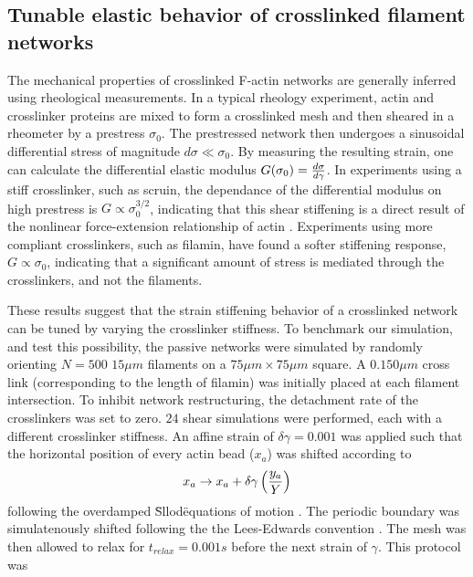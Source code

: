 \documentclass[12pt]{article}
\begin{document}
\subsection{Tunable elastic behavior of crosslinked filament networks}
\par
The mechanical properties of crosslinked F-actin networks are generally
inferred using rheological measurements\cite{gardel2004,koenderink2006,kasza2009,lin2010}.
In a typical rheology experiment, actin and crosslinker proteins are mixed to
form a crosslinked mesh and then sheared in a rheometer by a prestress
$\sigma_0$. The prestressed network then undergoes a sinusoidal
differential stress of magnitude $d\sigma\ll\sigma_0$. By measuring the resulting
strain, one can calculate the differential elastic modulus
$G(\sigma_0) = {d\sigma\over d\gamma}$. In experiments using a stiff
crosslinker, such as scruin, the dependance of the differential modulus on high
prestress is $G\propto\sigma_0^{3/2}$, indicating that this shear stiffening is
a direct result of the nonlinear force-extension relationship of actin 
\cite{gardel2004,lin2010}. Experiments using more compliant crosslinkers,
such as filamin, have found a softer stiffening response, $G\propto\sigma_0$,
indicating that a significant amount of stress is mediated through the
crosslinkers, and not the filaments\cite{kasza2009}.
\par 
These results suggest that the strain stiffening behavior of a crosslinked 
network can be tuned by varying the crosslinker
stiffness. To benchmark our simulation, and test this possibility, the 
passive networks were simulated by randomly orienting $N = 500$ $15\mu m$ 
filaments on a $75\mu m \times 75\mu m$ square. A $0.150\mu m$ cross link
(corresponding to the length of filamin) was initially placed at each filament
intersection.  
To inhibit network restructuring, the detachment rate of the crosslinkers was 
set to zero. $24$ shear simulations were performed, each with a different 
crosslinker stiffness. An affine strain of $\delta\gamma=0.001$ was applied such
that the horizontal position of every actin bead ($x_a$) was shifted according to  
\begin{equation}
  x_a \rightarrow x_a + \delta\gamma \left( {y_a\over Y} \right)
  \label{eqn:sllod}
\end{equation} 
following the overdamped \"Sllod\" equations of motion \cite{evans1984}. The 
periodic boundary was simulatenously shifted following the the Lees-Edwards 
convention \cite{allen}. The mesh was then allowed to relax for
$t_{relax} =0.001 s$ before the next strain of $\gamma$. This protocol was 
\end{document}
